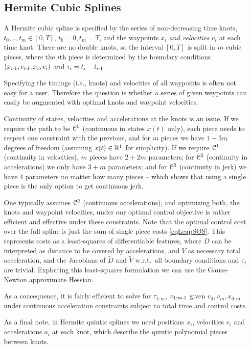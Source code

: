 \subsection{Hermite Cubic Splines}

A Hermite cubic spline is specified by the series of non-decreasing
time knots, $t_0,..,t_m \in [0,T]$, $t_0=0, t_m=T$, and the waypoints
$x_i$ \emph{and velocities} $v_i$ at each time knot. There are no
double knots, so the interval $[0,T]$ is split in $m$ cubic pieces,
where the $i$th piece is determined by the boundary conditions
$(x_{i{{\hspace*{-.0pt}\text{\rm -}\hspace*{-.5pt}}1}},v_{i{{\hspace*{-.0pt}\text{\rm -}\hspace*{-.5pt}}1}}, x_i, v_i)$ and $\tau_i = t_i - t_{i{{\hspace*{-.0pt}\text{\rm -}\hspace*{-.5pt}}1}}$.

Specifying the timings (i.e., knots) and velocities of all waypoints
is often not easy for a user. Therefore the question
is whether a series of given weypoints can easily be augmented with
optimal knots and waypoint velocities.

Continuity of states, velocities and accelerations at the knots is an
issue. If we require the path to be ${\cal C}^0$ (continuous in states
$x(t)$ only), each piece needs to respect one constraint with the
previous, and for $m$ pieces we have $1+3m$ degrees of freedom
(assuming $x(t)\in{\mathbb{R}}^1$ for simplicity). If we require ${\cal C}^1$
(continuity in velocities), $m$ pieces have $2+2m$ parameters; for
${\cal C}^2$ (continuity in accelerations) we only have $3+m$ parameters;
and for ${\cal C}^3$ (continuity in jerk) we have $4$ parameters no matter
how many pieces -- which shows that using a single piece is the only
option to get continuous jerk.

One typically assumes ${\cal C}^2$ (continuous accelerations), and
optimizing both, the knots and waypoint velocities, under our optimal
control objective is rather efficient and effective under these
constraints. Note that the optimal control cost over the full spline
is just the sum of single piece costs \eqref{eqLeapSOS}. This
represents costs as a least-squares of differentiable features, where
$D$ can be interpreted as distance to be covered by accelerations, and
$V$ as necessary total acceleration, and the Jacobians of $\tilde D$
and $\tilde V$ w.r.t.\ all boundary conditions and $\tau_i$ are
trivial. Exploiting this least-squares formulation we can use the
Gauss-Newton approximate Hessian.

As a concequence, it is fairly efficient to solve for $\tau_{1:m}$,
$v_{1:m{{\hspace*{-.0pt}\text{\rm -}\hspace*{-.5pt}}1}}$ given $v_0, v_m, x_{0:m}$ under continuous acceleration
constraints subject to total time and control costs.

As a final note, in Hermite quintic splines we need positions $x_i$,
velocities $v_i$ and accelerations $a_i$ at each knot, which describe
the quintic polynomial pieces between knots.

